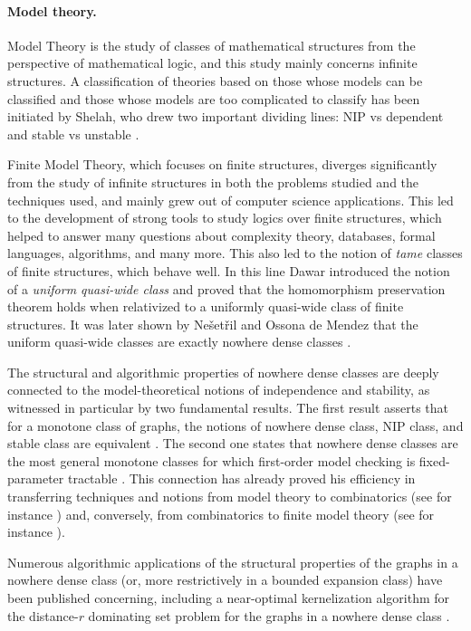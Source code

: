 \paragraph*{Model theory.}
Model Theory  is the study of classes of mathematical structures from the perspective of mathematical logic, and this study mainly concerns infinite structures.
A classification of theories based on those whose models can be classified and those whose models are too complicated to classify has been initiated by Shelah, who  drew two important dividing lines: NIP vs dependent and stable vs unstable \cite{shelah1990classification}.

Finite Model Theory, which focuses on finite structures,  diverges significantly from the study of infinite structures in both the problems studied and the techniques used, and mainly grew out of computer science applications.  This led to the development of strong tools to study logics over finite structures, which helped to answer many questions about  complexity theory, databases, formal languages, algorithms, and many more. This also led to the notion of {\em tame} classes of finite structures, which behave well.  In this line Dawar \cite{Dawar2010} introduced the notion of a \emph{uniform quasi-wide class} and proved 
     that the homomorphism preservation theorem holds when relativized to a uniformly quasi-wide class of finite structures. It was later shown 
by Ne\v{s}et\v{r}il and Ossona de Mendez  that the uniform quasi-wide classes are exactly nowhere dense classes \cite{ND_logic}.

The  structural and algorithmic properties of  nowhere dense classes  are deeply connected to  the model-theoretical notions of independence and stability, as witnessed in particular by two fundamental results. The first result asserts that for a monotone class of graphs, the notions of nowhere dense class, NIP class, and stable class are equivalent \cite{adler2014interpreting}. The second one states that nowhere dense classes are the most general monotone classes for which first-order model checking is fixed-parameter tractable \cite{grohe2017deciding}. This connection has already proved his efficiency in transferring techniques and notions from model theory to combinatorics (see for instance \cite{pilipczuk2018number}) and, conversely, from combinatorics to finite model theory (see for instance \cite{rossman2008homomorphism}).

Numerous algorithmic applications of the structural properties of the graphs in a nowhere dense class (or, more restrictively in a bounded expansion class) have been published concerning, including   a near-optimal kernelization algorithm for the distance-$r$ dominating set problem for the graphs in a nowhere dense class \cite{eickmeyer2016neighborhood}.

